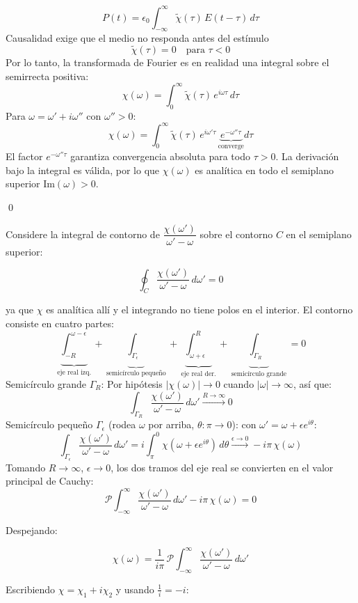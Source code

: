\documentclass[]{article}
\numberwithin{equation}{section}
\begin{document}
\begin{enumerate}
	$$P(t) = \epsilon_0 \int_{-\infty}^{\infty} \tilde{\chi}(\tau)\, E(t-\tau)\, d\tau$$
	Causalidad exige que el medio no responda antes del estímulo
	$$\tilde{\chi}(\tau) = 0 \quad \text{para } \tau < 0$$
	Por lo tanto, la transformada de Fourier es en realidad una integral sobre el semirrecta positiva:
	$$\chi(\omega) = \int_0^{\infty} \tilde{\chi}(\tau)\, e^{i\omega\tau}\, d\tau$$
	Para $\omega = \omega' + i\omega''$ con $\omega'' > 0$:
	$$\chi(\omega) = \int_0^{\infty} \tilde{\chi}(\tau)\, e^{i\omega'\tau}\, \underbrace{e^{-\omega''\tau}}_{\text{converge}} d\tau$$
	El factor $e^{-\omega''\tau}$ garantiza convergencia absoluta para todo $\tau > 0$. La derivación bajo la integral es válida, por lo que $\chi(\omega)$ es analítica en todo el semiplano superior $\text{Im}(\omega) > 0$.
	
	\qed
	
	Considere la integral de contorno de $\dfrac{\chi(\omega')}{\omega' - \omega}$ sobre el contorno $C$ en el semiplano superior:
	
	$$\oint_C \frac{\chi(\omega')}{\omega' - \omega}\, d\omega' = 0$$
	
	ya que $\chi$ es analítica allí y el integrando no tiene polos en el interior. El contorno consiste en cuatro partes:
	$$\underbrace{\int_{-R}^{\omega-\epsilon}}_{\text{eje real izq.}} + \underbrace{\int_{\Gamma_\epsilon}}_{\text{semicírculo pequeño}} + \underbrace{\int_{\omega+\epsilon}^{R}}_{\text{eje real der.}} + \underbrace{\int_{\Gamma_R}}_{\text{semicírculo grande}} = 0$$
	Semicírculo grande $\Gamma_R$: Por hipótesis $|\chi(\omega)| \to 0$ cuando $|\omega|\to\infty$, así que:
	$$\int_{\Gamma_R} \frac{\chi(\omega')}{\omega'-\omega}\,d\omega' \xrightarrow{R\to\infty} 0$$
	Semicírculo pequeño $\Gamma_\epsilon$ (rodea $\omega$ por arriba, $\theta: \pi \to 0$): con $\omega' = \omega + \epsilon e^{i\theta}$:
	$$\int_{\Gamma_\epsilon} \frac{\chi(\omega')}{\omega'-\omega}\,d\omega' = i\int_\pi^0 \chi(\omega + \epsilon e^{i\theta})\,d\theta \xrightarrow{\epsilon\to 0} -i\pi\,\chi(\omega)$$
	Tomando $R\to\infty$, $\epsilon\to 0$, los dos tramos del eje real se convierten en el valor principal de Cauchy:
	$$\mathcal{P}\int_{-\infty}^{\infty} \frac{\chi(\omega')}{\omega' - \omega}\,d\omega' - i\pi\,\chi(\omega) = 0$$
	
	Despejando:
	
	$$\boxed{\chi(\omega) = \frac{1}{i\pi}\,\mathcal{P}\!\int_{-\infty}^{\infty} \frac{\chi(\omega')}{\omega'-\omega}\,d\omega'}$$
	
	
	Escribiendo $\chi = \chi_1 + i\chi_2$ y usando $\frac{1}{i} = -i$:
	

\end{enumerate}
\end{document}
